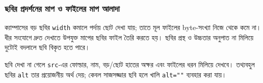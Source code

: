 \subsubsection{ছবির প্রদর্শনের মাপ ও ফাইলের মাপ আলাদা}
ক্যাম্পাসের বড় ছবির \texttt{width} কমালে পর্দায় ছোট দেখা যায়; তাতে মূল ফাইলের byte-সংখ্যা নিজে থেকে কমে না। ধীর সংযোগে দ্রুত দেখাতে উপযুক্ত মাপের ছবির ফাইল তৈরি করতে হয়। ছবির প্রস্থ ও উচ্চতার অনুপাত না মিলিয়ে দুটোই বদলালে ছবি বিকৃত হতে পারে।

ছবি দেখা না গেলে \texttt{src}-এর ফোল্ডার, নাম, বড়/ছোট হাতের অক্ষর এবং ফাইলের ধরন মিলিয়ে দেখবে। তথ্যবহুল ছবির \texttt{alt} তার প্রয়োজনীয় অর্থ দেয়; কেবল সাজসজ্জার ছবি হলে খালি \texttt{alt=""} ব্যবহার করা যায়।
